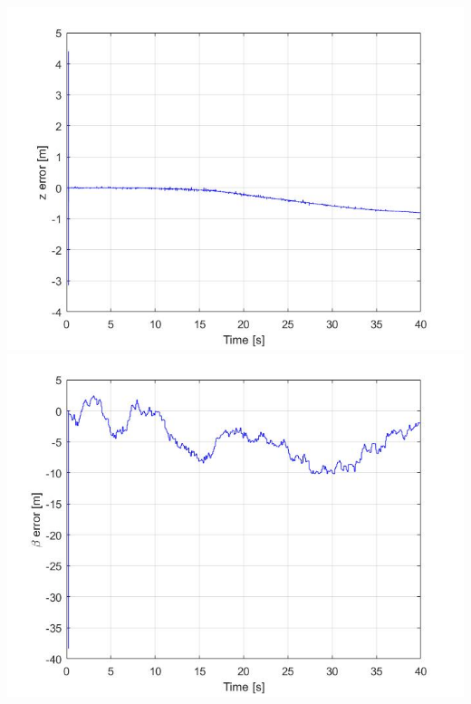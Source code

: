 \documentclass{beamer}
\begin{document}
\begin{frame}
\begin{columns}[t]
			\includegraphics[scale=0.18]{nlo_z_3}\\
			\includegraphics[scale=0.18]{nlo_beta_3}
		\end{columns}
	\end{frame}
\end{document}
